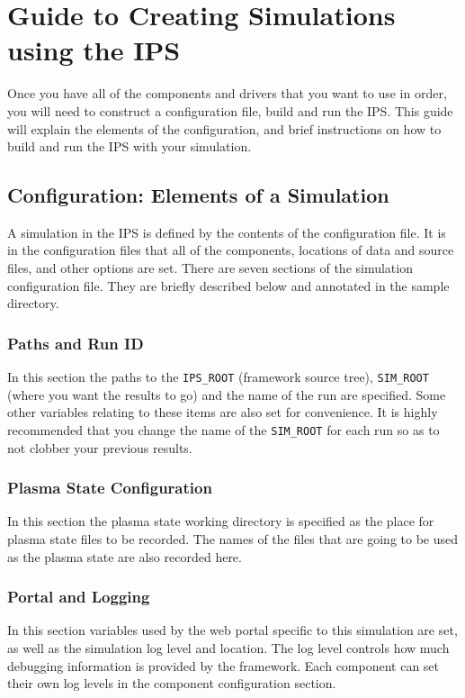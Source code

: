 \section{Guide to Creating Simulations using the IPS}
\label{sec:simulations}

\par
Once you have all of the components and drivers that you want to use in 
order, you will need to construct a configuration file, build and run the 
IPS.  This guide will explain the elements of the configuration, and brief 
instructions on how to build and run the IPS with your simulation.

\subsection{Configuration: Elements of a Simulation}
\label{sec:config}
\par 
A simulation in the {IPS} is defined by the contents of the configuration 
file.  It is in the configuration files that all of the components, 
locations of data and source files, and other options are set.  There are 
seven sections of the simulation configuration file.  They are briefly 
described below and annotated in the sample directory.

\subsubsection{Paths and Run ID}
\par 
In this section the paths to the \texttt{IPS\_ROOT} (framework source tree), 
\texttt{SIM\_ROOT} (where you want the results to go) and the name of the run are 
specified.  Some other variables relating to these items are also set for 
convenience.  It is highly recommended that you change the name of the 
\texttt{SIM\_ROOT} for each run so as to not clobber your previous results.

\subsubsection{Plasma State Configuration}
\par 
In this section the plasma state working directory is specified as the 
place for plasma state files to be recorded.  The names of the files that 
are going to be used as the plasma state are also recorded here.

\subsubsection{Portal and Logging}
\par 
In this section variables used by the web portal specific to this 
simulation are set, as well as the simulation log level and location.  The 
log level controls how much debugging information is provided by the 
framework.  Each component can set their own log levels in the component 
configuration section.

